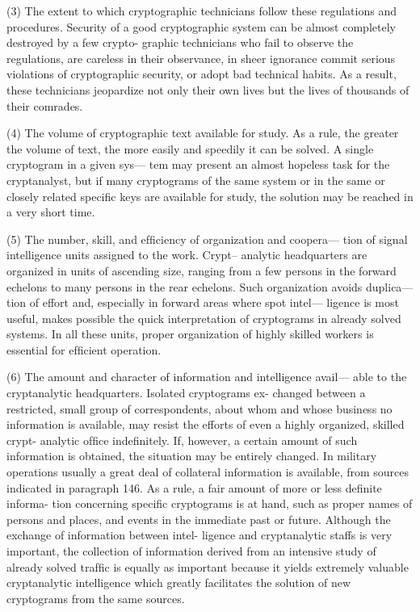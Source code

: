 (3) The extent to which cryptographic technicians follow these
regulations and procedures. Security of a good cryptographic
system can be almost completely destroyed by a few crypto-
graphic technicians who fail to observe the regulations, are
careless in their observance, in sheer ignorance commit serious
violations of cryptographic security, or adopt bad technical
habits. As a result, these technicians jeopardize not only their
own lives but the lives of thousands of their comrades.

(4) The volume of cryptographic text available for study. As a
rule, the greater the volume of text, the more easily and
speedily it can be solved. A single cryptogram in a given sys—
tem may present an almost hopeless task for the cryptanalyst,
but if many cryptograms of the same system or in the same or
closely related speciﬁc keys are available for study, the solution
may be reached in a very short time.

(5) The number, skill, and efﬁciency of organization and coopera—
tion of signal intelligence units assigned to the work. Crypt--
analytic headquarters are organized in units of ascending size,
ranging from a few persons in the forward echelons to many
persons in the rear echelons. Such organization avoids duplica—
tion of effort and, especially in forward areas where spot intel—
ligence is most useful, makes possible the quick interpretation
of cryptograms in already solved systems. In all these units,
proper organization of highly skilled workers is essential for
efﬁcient operation.

(6) The amount and character of information and intelligence avail—
able to the cryptanalytic headquarters. Isolated cryptograms ex-
changed between a restricted, small group of correspondents,
about whom and whose business no information is available,
may resist the efforts of even a highly organized, skilled crypt-
analytic ofﬁce indeﬁnitely. If, however, a certain amount of
such information is obtained, the situation may be entirely
changed. In military operations usually a great deal of collateral
information is available, from sources indicated in paragraph
146. As a rule, a fair amount of more or less deﬁnite informa-
tion concerning speciﬁc cryptograms is at hand, such as proper
names of persons and places, and events in the immediate past
or future. Although the exchange of information between intel-
ligence and cryptanalytic staffs is very important, the collection
of information derived from an intensive study of already
solved trafﬁc is equally as important because it yields extremely
valuable cryptanalytic intelligence which greatly facilitates the
solution of new cryptograms from the same sources.

